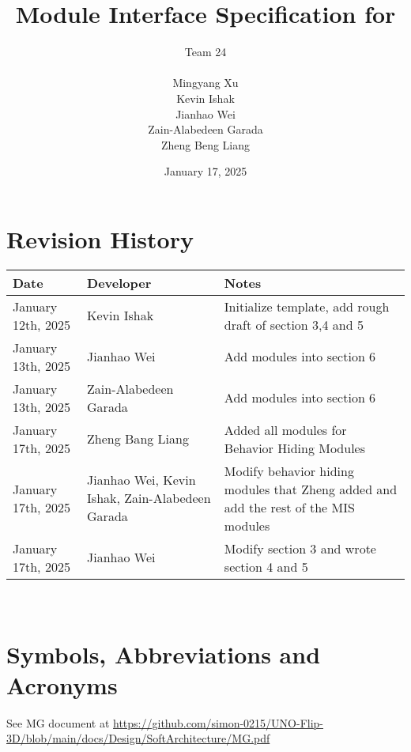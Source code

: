 \documentclass[12pt, titlepage]{article}
\begin{document}
\title{Module Interface Specification for }

\author{\authname Team 24 \\ \\ Mingyang Xu \\ Kevin Ishak \\ Jianhao Wei \\ Zain-Alabedeen Garada \\ Zheng Beng Liang}

\date{January 17, 2025}

\maketitle


\section{Revision History}

\begin{tabularx}{\textwidth}{p{4cm}p{3cm}X}
\toprule {\bf Date} & {\bf Developer} & {\bf Notes}\\
\midrule
January 12th, 2025 & Kevin Ishak & Initialize template, add rough draft of section 3,4 and 5\\
January 13th, 2025 & Jianhao Wei & Add modules into section 6\\
January 13th, 2025 & Zain-Alabedeen Garada & Add modules into section 6\\
January 17th, 2025 & Zheng Bang Liang & Added all modules for Behavior Hiding Modules\\
January 17th, 2025 & Jianhao Wei, Kevin Ishak, Zain-Alabedeen Garada & Modify behavior hiding modules that Zheng added and add the rest of the MIS modules \\
January 17th, 2025 & Jianhao Wei & Modify section 3 and wrote section 4 and 5\\
\bottomrule
\end{tabularx}

~\newpage

\section{Symbols, Abbreviations and Acronyms}

See MG document at \url{https://github.com/simon-0215/UNO-Flip-3D/blob/main/docs/Design/SoftArchitecture/MG.pdf}
\end{document}
